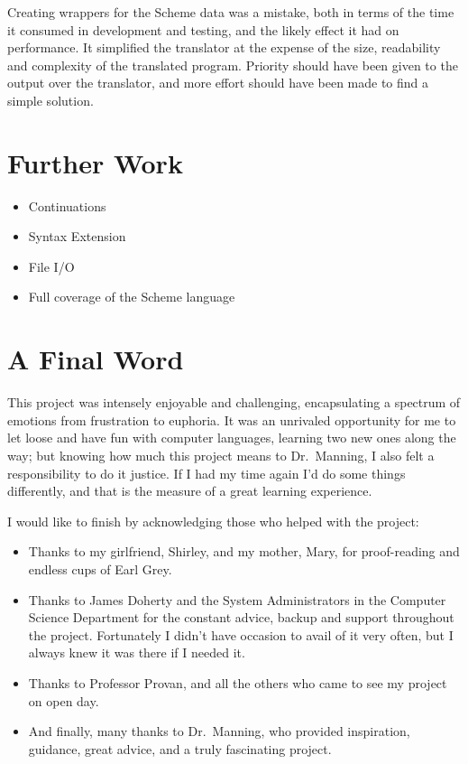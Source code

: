 Creating wrappers for the Scheme data was a mistake, both in terms of the time
it consumed in development and testing, and the likely effect it had on
performance. It simplified the translator at the expense of the size,
readability and complexity of the translated program. Priority should have been
given to the output over the translator, and more effort should have been made
to find a simple solution.


\section{Further Work}

\begin{itemize}
\item Continuations
\item Syntax Extension
\item File I/O
\item Full coverage of the Scheme language
\end{itemize}


\section{A Final Word}

This project was intensely enjoyable and challenging, encapsulating a spectrum
of emotions from frustration to euphoria. It was an unrivaled opportunity for me
to let loose and have fun with computer languages, learning two new ones along
the way; but knowing how much this project means to Dr.\ Manning, I also felt a
responsibility to do it justice. If I had my time again I'd do some things
differently, and that is the measure of a great learning experience.

I would like to finish by acknowledging those who helped with the project:
\begin{itemize}
\item Thanks to my girlfriend, Shirley, and my mother, Mary, for proof-reading
and endless cups of Earl Grey.
\item Thanks to James Doherty and the System Administrators in the Computer
Science Department for the constant advice, backup and support throughout the
project. Fortunately I didn't have occasion to avail of it very often, but I
always knew it was there if I needed it.
\item Thanks to Professor Provan, and all the others who came to see my project
on open day.
\item And finally, many thanks to Dr.\ Manning, who provided inspiration,
guidance, great advice, and a truly fascinating project.
\end{itemize}
